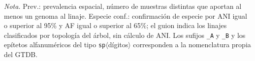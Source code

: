 \begin{table}[H]
\vspace{0.5em}
\begin{minipage}{0.95\textwidth}
\footnotesize
\textit{Nota.} Prev.: prevalencia espacial, número de muestras distintas que
aportan al menos un genoma al linaje. Especie conf.: confirmación de especie por
ANI igual o superior al 95\% y AF igual o superior al 65\%; el guion indica
los linajes clasificados por
topología del árbol, sin cálculo de ANI. Los sufijos \texttt{\_A} y \texttt{\_B}
y los epítetos alfanuméricos del tipo \texttt{sp}$\langle$dígitos$\rangle$
corresponden a la nomenclatura propia del GTDB.
\end{minipage}
\end{table}

